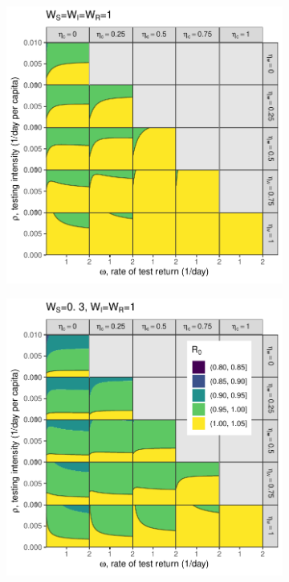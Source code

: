 \documentclass[12pt]{article}
\theoremstyle{definition} %
\begin{document}
\begin{figure}[h!]
\centering
\begin{subfigure}[t]{.45\textwidth}
\centering
\includegraphics[width=\linewidth]{./pix/R0contour_random.pdf}
\caption{}\label{p.a}
\end{subfigure}
%
\begin{subfigure}[t]{.45\textwidth}
\centering
\includegraphics[width=\linewidth]{./pix/R0contour_TTI.pdf}

\end{subfigure}
\end{figure}
\end{document}
